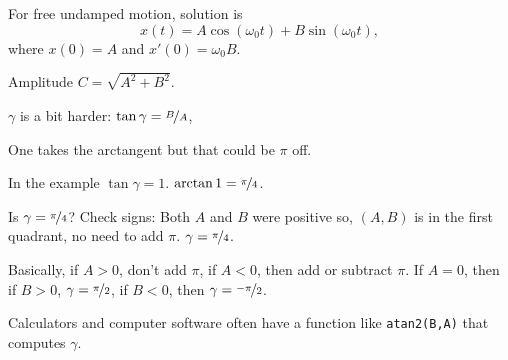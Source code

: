 \documentclass[10pt,aspectratio=169]{beamer}
\begin{document}
\begin{frame}
For free undamped motion, solution is
\begin{equation*}
x(t) = A \cos (\omega_0 t) + B \sin (\omega_0 t) ,
\end{equation*}
where $x(0) = A$ and $x'(0) = \omega_0 B$.

\medskip
\pause

Amplitude $C = \sqrt{A^2+B^2}$.

\medskip
\pause

$\gamma$ is a bit harder: $\tan \gamma = \nicefrac{B}{A}$, 

\pause

One takes the arctangent but that could be $\pi$ off.

\medskip
\pause

In the example $\tan \gamma = 1$.  \quad $\arctan 1 = \nicefrac{\pi}{4}$.

\medskip
\pause

Is $\gamma = \nicefrac{\pi}{4}$? \pause  Check signs: Both $A$ and $B$ were
positive so, $(A,B)$ is in the first quadrant, no need to add $\pi$.
\pause
$\gamma = \nicefrac{\pi}{4}$.

\medskip
\pause

Basically, if $A > 0$, don't add $\pi$, if $A < 0$, then add or subtract
$\pi$. \pause
If $A = 0$, then if $B > 0$, $\gamma = \nicefrac{\pi}{2}$, if
$B < 0$, then $\gamma =\nicefrac{-\pi}{2}$.

\medskip
\pause

Calculators and computer software often have a function like
\texttt{atan2(B,A)} that computes $\gamma$.

\end{frame}
\end{document}
